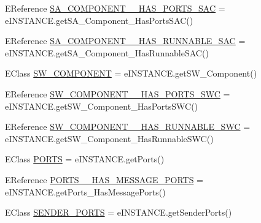 \begin{DoxyCompactItemize}
\item 
E\-Reference \hyperlink{interfaceshootingmachineemfmodel_1_1_shootingmachineemfmodel_package_1_1_literals_a84f344e1e40c66de4c0fab095b97b7ee}{S\-A\-\_\-\-C\-O\-M\-P\-O\-N\-E\-N\-T\-\_\-\-\_\-\-H\-A\-S\-\_\-\-P\-O\-R\-T\-S\-\_\-\-S\-A\-C} = e\-I\-N\-S\-T\-A\-N\-C\-E.\-get\-S\-A\-\_\-\-Component\-\_\-\-Has\-Ports\-S\-A\-C()
\item 
E\-Reference \hyperlink{interfaceshootingmachineemfmodel_1_1_shootingmachineemfmodel_package_1_1_literals_af59a0a37c624a31d6acbfecca3f1bc0b}{S\-A\-\_\-\-C\-O\-M\-P\-O\-N\-E\-N\-T\-\_\-\-\_\-\-H\-A\-S\-\_\-\-R\-U\-N\-N\-A\-B\-L\-E\-\_\-\-S\-A\-C} = e\-I\-N\-S\-T\-A\-N\-C\-E.\-get\-S\-A\-\_\-\-Component\-\_\-\-Has\-Runnable\-S\-A\-C()
\item 
E\-Class \hyperlink{interfaceshootingmachineemfmodel_1_1_shootingmachineemfmodel_package_1_1_literals_a4efac8ee87bb281dc7448e386107964d}{S\-W\-\_\-\-C\-O\-M\-P\-O\-N\-E\-N\-T} = e\-I\-N\-S\-T\-A\-N\-C\-E.\-get\-S\-W\-\_\-\-Component()
\item 
E\-Reference \hyperlink{interfaceshootingmachineemfmodel_1_1_shootingmachineemfmodel_package_1_1_literals_acce8f7d770b974806d1073dc91d451ea}{S\-W\-\_\-\-C\-O\-M\-P\-O\-N\-E\-N\-T\-\_\-\-\_\-\-H\-A\-S\-\_\-\-P\-O\-R\-T\-S\-\_\-\-S\-W\-C} = e\-I\-N\-S\-T\-A\-N\-C\-E.\-get\-S\-W\-\_\-\-Component\-\_\-\-Has\-Ports\-S\-W\-C()
\item 
E\-Reference \hyperlink{interfaceshootingmachineemfmodel_1_1_shootingmachineemfmodel_package_1_1_literals_ab335d98bb2bc86424c71161230c1c6ac}{S\-W\-\_\-\-C\-O\-M\-P\-O\-N\-E\-N\-T\-\_\-\-\_\-\-H\-A\-S\-\_\-\-R\-U\-N\-N\-A\-B\-L\-E\-\_\-\-S\-W\-C} = e\-I\-N\-S\-T\-A\-N\-C\-E.\-get\-S\-W\-\_\-\-Component\-\_\-\-Has\-Runnable\-S\-W\-C()
\item 
E\-Class \hyperlink{interfaceshootingmachineemfmodel_1_1_shootingmachineemfmodel_package_1_1_literals_a4a3e6c42963dc5b7edae879c0e1dddff}{P\-O\-R\-T\-S} = e\-I\-N\-S\-T\-A\-N\-C\-E.\-get\-Ports()
\item 
E\-Reference \hyperlink{interfaceshootingmachineemfmodel_1_1_shootingmachineemfmodel_package_1_1_literals_af1aad2cd07c3bdb92ac4925b82c06d86}{P\-O\-R\-T\-S\-\_\-\-\_\-\-H\-A\-S\-\_\-\-M\-E\-S\-S\-A\-G\-E\-\_\-\-P\-O\-R\-T\-S} = e\-I\-N\-S\-T\-A\-N\-C\-E.\-get\-Ports\-\_\-\-Has\-Message\-Ports()
\item 
E\-Class \hyperlink{interfaceshootingmachineemfmodel_1_1_shootingmachineemfmodel_package_1_1_literals_a27631e3b6ae881f7793efd141acfd678}{S\-E\-N\-D\-E\-R\-\_\-\-P\-O\-R\-T\-S} = e\-I\-N\-S\-T\-A\-N\-C\-E.\-get\-Sender\-Ports()

\end{DoxyCompactItemize}

